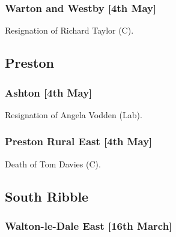 \documentclass[a4paper,openany]{book}
\begin{document}
\begin{resultsiii}
\subsubsection*{Warton and Westby \hspace*{\fill}\nolinebreak[1]%
\enspace\hspace*{\fill}
[4th May]}


Resignation of Richard Taylor (C).

\subsection*{Preston}

\subsubsection*{Ashton \hspace*{\fill}\nolinebreak[1]%
\enspace\hspace*{\fill}
[4th May]}


Resignation of Angela Vodden (Lab).

\subsubsection*{Preston Rural East \hspace*{\fill}\nolinebreak[1]%
\enspace\hspace*{\fill}
[4th May]}


Death of Tom Davies (C).

\subsection*{South Ribble}

\subsubsection*{Walton-le-Dale East \hspace*{\fill}\nolinebreak[1]%
\enspace\hspace*{\fill}
[16th March]}



\end{resultsiii}
\end{document}
